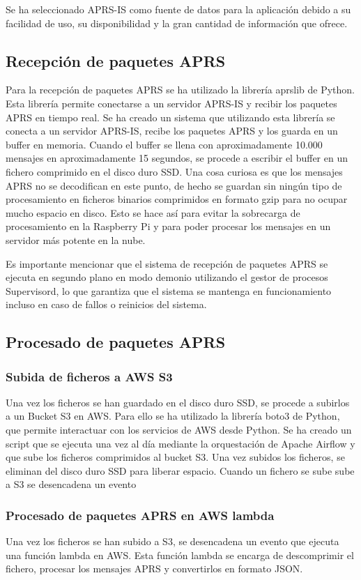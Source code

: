 Se ha seleccionado APRS-IS como fuente de datos para la aplicación debido a su facilidad de uso, su disponibilidad y la gran cantidad de información que ofrece.

\subsection{Recepción de paquetes APRS}
Para la recepción de paquetes APRS se ha utilizado la librería aprslib de Python. Esta librería permite conectarse a un servidor APRS-IS y recibir los paquetes APRS en tiempo real. Se ha creado un sistema que utilizando esta librería se conecta a un servidor APRS-IS, recibe los paquetes APRS y los guarda en un buffer en memoria. Cuando el buffer se llena con aproximadamente 10.000 mensajes en aproximadamente 15 segundos, se procede a escribir el buffer en un fichero comprimido en el disco duro SSD.
Una cosa curiosa es que los mensajes APRS no se decodifican en este punto, de hecho se guardan sin ningún tipo de procesamiento en ficheros binarios comprimidos en formato gzip para no ocupar mucho espacio en disco. Esto se hace así para evitar la sobrecarga de procesamiento en la Raspberry Pi y para poder procesar los mensajes en un servidor más potente en la nube.

Es importante mencionar que el sistema de recepción de paquetes APRS se ejecuta en segundo plano en modo demonio utilizando el gestor de procesos Supervisord, lo que garantiza que el sistema se mantenga en funcionamiento incluso en caso de fallos o reinicios del sistema.

\subsection{Procesado de paquetes APRS}
\subsubsection{Subida de ficheros a AWS S3}
Una vez los ficheros se han guardado en el disco duro SSD, se procede a subirlos a un Bucket S3 en AWS. Para ello se ha utilizado la librería boto3 de Python, que permite interactuar con los servicios de AWS desde Python. Se ha creado un script que se ejecuta una vez al día mediante la orquestación de Apache Airflow y que sube los ficheros comprimidos al bucket S3. Una vez subidos los ficheros, se eliminan del disco duro SSD para liberar espacio. Cuando un fichero se sube sube a S3 se desencadena un evento
\subsubsection{Procesado de paquetes APRS en AWS lambda}
Una vez los ficheros se han subido a S3, se desencadena un evento que ejecuta una función lambda en AWS. Esta función lambda se encarga de descomprimir el fichero, procesar los mensajes APRS y convertirlos en formato JSON.


